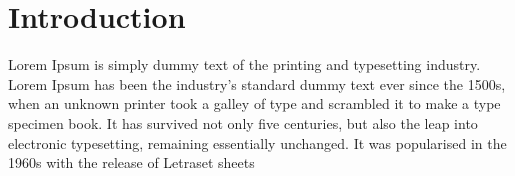 \section{Introduction}
Lorem Ipsum is simply dummy text of the printing and typesetting industry.
Lorem Ipsum has been the industry's standard dummy text ever since the 1500s,
when an unknown printer took a galley of type and scrambled it to make a type specimen book.
It has survived not only five centuries, but also the leap into electronic typesetting,
remaining essentially unchanged. It was popularised in the 1960s with the release of Letraset sheets


